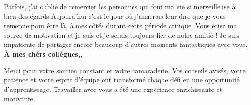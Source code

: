 \begin{center}
\normalsize Parfois, j'ai oublié de remercier les personnes qui font ma vie si merveilleuse à bien des
égards.Aujourd'hui c'est le jour où j'aimerais leur dire que je vous remercie pour être là, à mes côtés durant cette période critique. Vous étiez ma source de motivation et je suis et je serais toujours fier de notre amitié !
Je suis impatiente de partager encore beaucoup d'autres moments fantastiques avec vous. 
\newpage
\center \textbf{À mes chérs collégues,},

\normalsize Merci pour votre soutien constant et votre camaraderie. Vos conseils avisés, votre patience et votre esprit d'équipe ont transformé chaque défi
  en une opportunité d'apprentissage. Travailler avec vous a été une expérience enrichissante et motivante. 

\begin{flushright}
    \LARGE \@author
\end{flushright}
\end{center}











